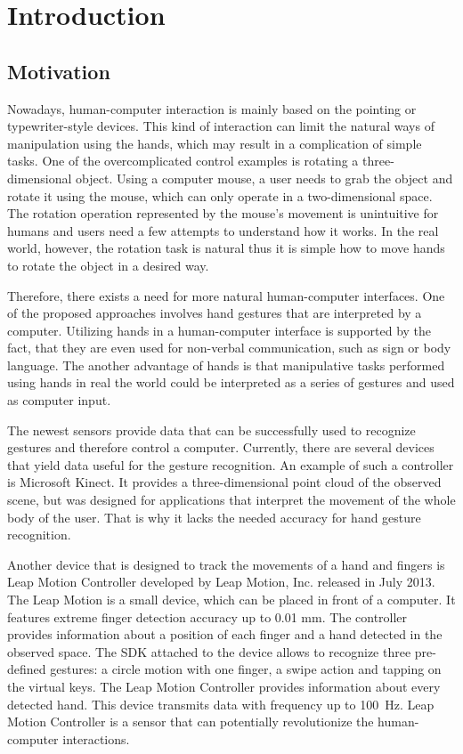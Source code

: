 \chapter{Introduction}

\section{Motivation}

Nowadays, human-computer interaction is mainly based on the pointing or typewriter-style devices. 
This kind of interaction can limit the natural ways of manipulation using the hands, which may result in a complication of simple tasks.
One of the overcomplicated control examples is rotating a three-dimensional object.
Using a computer mouse, a user needs to grab the object and rotate it using the mouse, which can only operate in a two-dimensional space. 
The rotation operation represented by the mouse's movement is unintuitive for humans and users need a few attempts to understand how it works. 
In the real world, however, the rotation task is natural thus it is simple how to move hands to rotate the object in a desired way.

Therefore, there exists a need for more natural human-computer interfaces.
One of the proposed approaches involves hand gestures that are interpreted by a computer.
Utilizing hands in a human-computer interface is supported by the fact, that they are even used for non-verbal communication, such as sign or body language.
The another advantage of hands is that manipulative tasks performed using hands in real the world could be interpreted as a series of gestures and used as computer input.

The newest sensors provide data that can be successfully used to recognize gestures and therefore control a computer.
Currently, there are several devices that yield data useful for the gesture recognition. 
An example of such a controller is Microsoft Kinect.
It provides a three-dimensional point cloud of the observed scene, but was designed for applications that interpret the movement of the whole body of the user. 
That is why it lacks the needed accuracy for hand gesture recognition.
 
Another device that is designed to track the movements of a hand and fingers is Leap Motion Controller developed by Leap Motion, Inc. released in July 2013. 
The Leap Motion is a small device, which can be placed in front of a computer. It features extreme finger detection accuracy up to 0.01 mm. 
The controller provides information about a position of each finger and a hand detected in the observed space.
The SDK attached to the device allows to recognize three pre-defined gestures: a circle motion with one finger, a swipe action and tapping on the virtual keys. 
The Leap Motion Controller provides information about every detected hand. This device transmits data with frequency up to 100~Hz. 
Leap Motion Controller is a sensor that can potentially revolutionize the human-computer interactions. 

